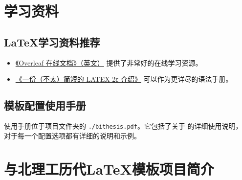 \begin{appendices}
\label{resources}
  \chapter{学习资料}

  \section{\LaTeX 学习资料推荐}
  \begin{itemize}[nosep]
    \item \href{https://www.overleaf.com/learn/latex/Tutorials}{《Overleaf 在线文档》（英文）} 提供了非常好的在线学习资源。
    \item \href{https://texdoc.org/serve/lshort-zh-cn.pdf/0}{《一份（不太）简短的 LATEX 2ε 介绍》} 可以作为更详尽的语法手册。
  \end{itemize}

  \section{\BIThesis 模板配置使用手册}
  \BIThesis{} 使用手册位于项目文件夹的 \verb|./bithesis.pdf|。它包括了关于 \BIThesis{} 的详细使用说明，
      对于每一个配置选项都有详细的说明和示例。
      
  \chapter{\BIThesis 与北理工历代\LaTeX{}模板项目简介}
  

\end{appendices}
